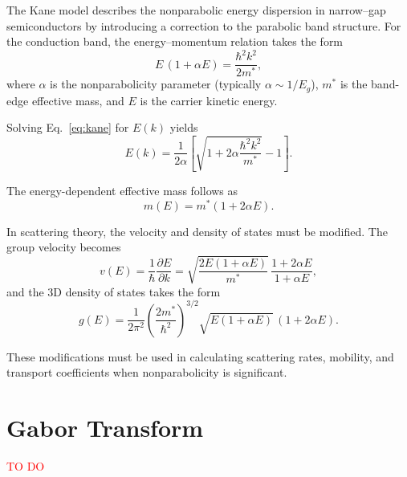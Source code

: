 The Kane model describes the nonparabolic energy dispersion in narrow–gap
semiconductors by introducing a correction to the parabolic band structure.
For the conduction band, the energy--momentum relation takes the form
\begin{equation}
E\,(1 + \alpha E) = \frac{\hbar^{2} k^{2}}{2 m^{\ast}},
\label{eq:kane}
\end{equation}
where $\alpha$ is the nonparabolicity parameter (typically
$\alpha \sim 1/E_{g}$), $m^{\ast}$ is the band-edge effective mass, and
$E$ is the carrier kinetic energy.




Solving Eq.~\eqref{eq:kane} for $E(k)$ yields
\begin{equation}
E(k) = \frac{1}{2\alpha}
\left[
\sqrt{1 + 2 \alpha \frac{\hbar^{2} k^{2}}{m^{\ast}}}
- 1
\right].
\end{equation}



The energy-dependent effective mass follows as
\begin{equation}
m(E) = m^{\ast} (1 + 2\alpha E).
\end{equation}

In scattering theory, the velocity and density of states must be modified.
The group velocity becomes
\begin{equation}
v(E) = \frac{1}{\hbar} \frac{\partial E}{\partial k}
     = \sqrt{\frac{2E(1+\alpha E)}{m^{\ast}}}\, \frac{1 + 2\alpha E}{1 + \alpha E},
\end{equation}
and the 3D density of states takes the form
\begin{equation}
g(E) = \frac{1}{2\pi^{2}}
\left( \frac{2 m^{\ast}}{\hbar^{2}} \right)^{3/2}
\sqrt{E(1+\alpha E)}\, (1 + 2\alpha E).
\end{equation}

These modifications must be used in calculating scattering rates, mobility,
and transport coefficients when nonparabolicity is significant.



\section{Gabor Transform}

\textcolor{red}{TO DO}
